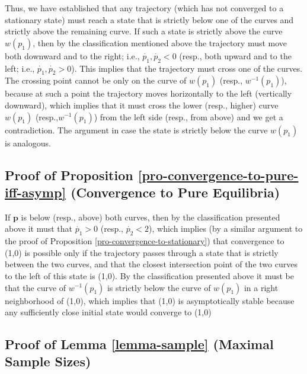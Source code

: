 \documentclass[12pt]{article}
\numberwithin{equation}{section}
\numberwithin{figure}{section}
\theoremstyle{definition}
\theoremstyle{plain}
\theoremstyle{plain}
\theoremstyle{plain}
\theoremstyle{remark}
\theoremstyle{plain}
\theoremstyle{plain}
\begin{document}
Thus, we have established that any trajectory (which has not converged to a stationary state) must reach a state that is strictly below one of the curves and strictly above the remaining curve. If such a state is strictly above the curve $w(p_1)$, then by the classification mentioned above the trajectory must move both downward and to the right; i.e., $\dot{p_1},\dot{p_2}<0$ (resp., both upward and to the left; i.e., $\dot{p_1},\dot{p_2}>0$). This implies that the trajectory must cross one of the curves. The crossing point cannot be only on the curve of $w(p_1)$ (resp., $w^{-1}(p_1)$), because at such a point the trajectory moves horizontally to the left (vertically downward), which implies that it must cross the lower (resp., higher)  curve $w(p_1)$ (resp.,$w^{-1}(p_1)$) from the left side (resp., from above) and we get a contradiction. The argument in case the state is strictly below the curve $w(p_1)$ is analogous.
 
\subsection{Proof of Proposition \ref{pro-convergence-to-pure-iff-asymp} (Convergence to Pure Equilibria)}\label{proof-converge-pure-iss-asymp}
 If $\textbf{p}$ is below  (resp., above) both curves, then by the classification presented above it must that $\dot{p_1}>0$ (resp., $\dot{p_2}<2$), which implies (by a similar argument to the proof of Proposition \ref{pro-convergence-to-stationary}) that convergence to (1,0) is possible only if the trajectory passes through a state that is strictly between the two curves, and that the closest intersection point of the two curves to the left of this state is (1,0). By the classification presented above it must be that the curve of $w^{-1}(p_1)$ is strictly below the curve of $w(p_1)$ in a right neighborhood of (1,0), which implies that (1,0) is asymptotically stable because any sufficiently close initial state would converge to (1,0)
\subsection {Proof of Lemma \ref{lemma-sample} (Maximal Sample Sizes)}\label{lem-proof}
\end{document}
